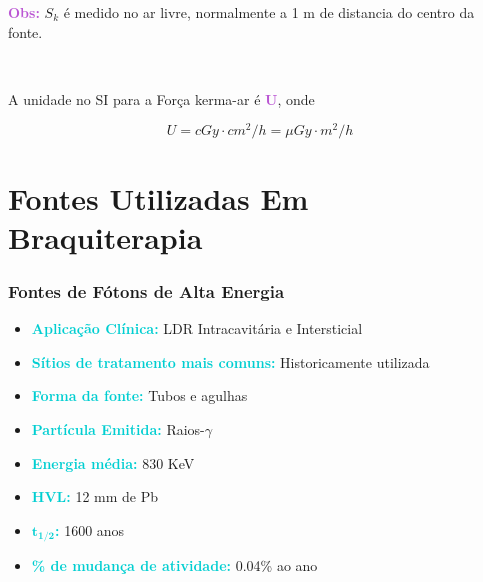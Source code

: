 \documentclass[11pt,a4paper]{article}
\begin{document}
			\textbf{\textcolor{MediumOrchid}{Obs:} } $S_k$ é medido no ar livre, normalmente a 1 m de distancia do centro da fonte.

			\

			A unidade no SI para a Força kerma-ar é \textbf{\textcolor{MediumOrchid}{U}}, onde


			\begin{equation}
				U = cGy \cdot cm^2 / h = \mu Gy \cdot m^2 / h
			\end{equation}

\section{Fontes Utilizadas Em Braquiterapia}

\subsubsection*{Fontes de  Fótons de Alta Energia}
		
	\begin{tcolorbox}[width=\textwidth, colback={white}, colbacktitle={DarkTurquoise!50!white}, title={$\bigstar$ \LobsterTwo{Rádio 226} $\bigstar$}, coltitle={CarnationPink}, colframe={DarkTurquoise}, fonttitle=\rmfamily\bfseries\Large, breakable]
		
			\begin{itemize}
				\item \textcolor{DarkTurquoise}{\textbf{Aplicação Clínica:}} LDR Intracavitária e Intersticial
				\item \textcolor{DarkTurquoise}{\textbf{Sítios de tratamento mais comuns:}} Historicamente utilizada
				\item \textcolor{DarkTurquoise}{\textbf{Forma da fonte:}} Tubos e agulhas
				\item \textcolor{DarkTurquoise}{\textbf{Partícula Emitida:}} Raios-$\gamma$
				\item \textcolor{DarkTurquoise}{\textbf{Energia média:}} 830 KeV
				\item \textcolor{DarkTurquoise}{\textbf{HVL:}} 12 mm de Pb
				\item \textcolor{DarkTurquoise}{\textbf{$\mathbf{t_{1/2}}$:}} 1600 anos
				\item \textcolor{DarkTurquoise}{\textbf{\% de mudança de atividade:}} 0.04\% ao ano
			\end{itemize}
	\end{tcolorbox}
			
\end{document}
